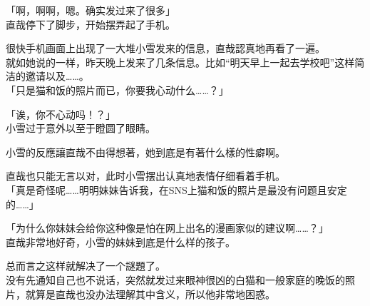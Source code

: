 「啊，啊啊，嗯。确实发过来了很多」\\

直哉停下了脚步，开始摆弄起了手机。

很快手机画面上出现了一大堆小雪发来的信息，直哉認真地再看了一遍。\\

就如她说的一样，昨天晚上发来了几条信息。比如“明天早上一起去学校吧”这样简洁的邀请以及……。\\

「只是猫和饭的照片而已，你要我心动什么……？」

「诶，你不心动吗！？」\\

小雪过于意外以至于瞪圆了眼睛。

小雪的反應讓直哉不由得想著，她到底是有著什么樣的性癖啊。

直哉也只能无言以对，此时小雪摆出认真地表情仔细看着手机。\\

「真是奇怪呢……明明妹妹告诉我，在SNS上猫和饭的照片是最没有问题且安定的……」

「为什么你妹妹会给你这种像是怕在网上出名的漫画家似的建议啊……？」\\

直哉非常地好奇，小雪的妹妹到底是什么样的孩子。

总而言之这样就解决了一个謎題了。\\

没有先通知自己也不说话，突然就发过来眼神很凶的白猫和一般家庭的晚饭的照片，就算是直哉也没办法理解其中含义，所以他非常地困惑。

